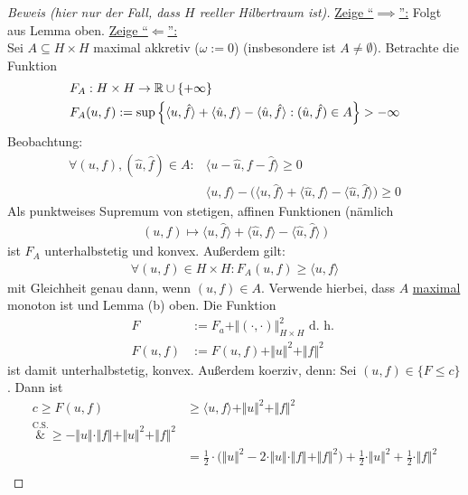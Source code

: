 \begin{proof}[Beweis (hier nur der Fall, dass $H$ reeller Hilbertraum ist)]\enter
	\underline{Zeige ``$\implies$'':} Folgt aus Lemma oben.\nl
	\underline{Zeige ``$\Longleftarrow$'':}\\
	Sei $A\subseteq H\times H$ maximal akkretiv ($\omega:=0$) (insbesondere ist $A\neq\emptyset$). 
	Betrachte die Funktion 
	\begin{align*}
		&F_A:H\times H\to\mathbb{R}\cup\lbrace+\infty\rbrace\\
		&F_A(u,f):=\sup\Big\lbrace\langle u,\hat{f}\rangle+\langle\hat{u},f\rangle-\langle\hat{u},\hat{f}\rangle:(\hat{u},\hat{f})\in A\Big\rbrace>-\infty
	\end{align*}
	Beobachtung: 
	\begin{align*}
		\forall (u,f),(\hat{u},\hat{f})\in A:
		&\big\langle u-\hat{u},f-\hat{f}\big\rangle\geq0\\
		&\langle u,f\rangle-\Big(\big\langle u,\hat{f}\big\rangle+\big\langle\hat{u},f\big\rangle-\big\langle\hat{u},\hat{f}\big\rangle\Big)\geq0
	\end{align*}
	Als punktweises Supremum von stetigen, affinen Funktionen (nämlich 
	\begin{align*}
		(u,f)\mapsto\big\langle u,\hat{f}\big\rangle+\big\langle\hat{u},f\big\rangle-\big\langle\hat{u},\hat{f}\big\rangle~\big)
	\end{align*}
	ist $F_A$ unterhalbstetig und konvex. 
	Außerdem gilt:
	\begin{align*}
		\forall (u,f)\in H\times H:F_A(u,f)\geq\langle u,f\rangle
	\end{align*}
	mit Gleichheit genau dann, wenn $(u,f)\in A$. 
	Verwende hierbei, dass $A$ \ul{maximal} monoton ist und Lemma (b) oben. 
	Die Funktion
	\begin{align*}
		F&:=F_a+\Vert(\cdot,\cdot)\Vert^2_{H\times H}\text{ d. h. }\\
		F(u,f)&:=F(u,f)+\Vert u\Vert^2+\Vert f\Vert^2
	\end{align*}
	ist damit unterhalbstetig, konvex. 
	Außerdem koerziv, denn: Sei $(u,f)\in\lbrace F\leq c\rbrace$. 
	Dann ist
	\begin{align*}
		c\geq F(u,f)
		&\geq\langle u,f\rangle+\Vert u\Vert^2+\Vert f\Vert^2\\
		\overset{\text{C.S.}}&{\geq}
		-\Vert u\Vert\cdot\Vert f\Vert+\Vert u\Vert^2+\Vert f\Vert^2\\
		&=\frac{1}{2}\cdot\big(\Vert u\Vert^2-2\cdot\Vert u\Vert\cdot\Vert f\Vert+\Vert f\Vert^2\big)+\frac{1}{2}\cdot\Vert u\Vert^2+\frac{1}{2}\cdot\Vert f\Vert^2\\

\end{align*}
\end{proof}
